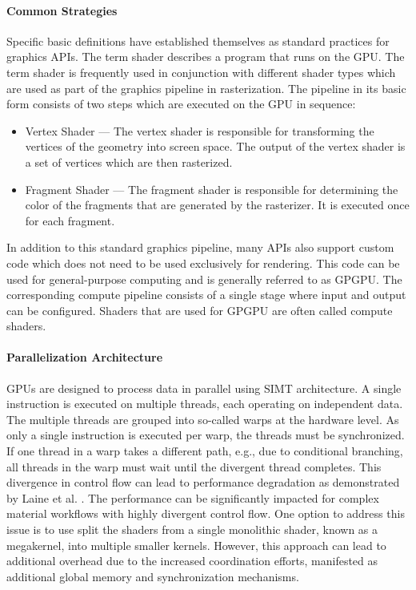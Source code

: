 \paragraph{Common Strategies}
\label{sec:commonGpuStrategies}

Specific basic definitions have established themselves as standard practices for graphics \glspl{API}. The term shader describes a program that runs on the \gls{GPU}. The term shader is frequently used in conjunction with different shader types which are used as part of the graphics pipeline in rasterization. The pipeline in its basic form consists of two steps which are executed on the \gls{GPU} in sequence:

\begin{itemize}
  \item{Vertex Shader} — The vertex shader is responsible for transforming the vertices of the geometry into screen space. The output of the vertex shader is a set of vertices which are then rasterized.
  \item{Fragment Shader} — The fragment shader is responsible for determining the color of the fragments that are generated by the rasterizer. It is executed once for each fragment.
\end{itemize}

In addition to this standard graphics pipeline, many \glspl{API} also support custom code which does not need to be used exclusively for rendering. This code can be used for general-purpose computing and is generally referred to as \gls{GPGPU}. The corresponding compute pipeline consists of a single stage where input and output can be configured. Shaders that are used for \gls{GPGPU} are often called compute shaders.

\paragraph{Parallelization Architecture}
\label{sec:parallelization-architecture}

\glspl{GPU} are designed to process data in parallel using \gls{SIMT} architecture. A single instruction is executed on multiple threads, each operating on independent data. The multiple threads are grouped into so-called warps at the hardware level. As only a single instruction is executed per warp, the threads must be synchronized. If one thread in a warp takes a different path, e.g., due to conditional branching, all threads in the warp must wait until the divergent thread completes. This divergence in control flow can lead to performance degradation as demonstrated by Laine et al. \cite{laine2013megakernels}. The performance can be significantly impacted for complex material workflows with highly divergent control flow. One option to address this issue is to use split the shaders from a single monolithic shader, known as a megakernel, into multiple smaller kernels. However, this approach can lead to additional overhead due to the increased coordination efforts, manifested as additional global memory and synchronization mechanisms.

